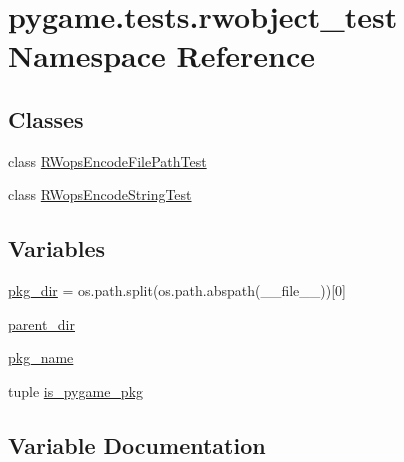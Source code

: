 \hypertarget{namespacepygame_1_1tests_1_1rwobject__test}{}\section{pygame.\+tests.\+rwobject\+\_\+test Namespace Reference}
\label{namespacepygame_1_1tests_1_1rwobject__test}
\subsection*{Classes}
\begin{DoxyCompactItemize}
\item 
class \hyperlink{classpygame_1_1tests_1_1rwobject__test_1_1_r_wops_encode_file_path_test}{R\+Wops\+Encode\+File\+Path\+Test}
\item 
class \hyperlink{classpygame_1_1tests_1_1rwobject__test_1_1_r_wops_encode_string_test}{R\+Wops\+Encode\+String\+Test}
\end{DoxyCompactItemize}
\subsection*{Variables}
\begin{DoxyCompactItemize}
\item 
\hyperlink{namespacepygame_1_1tests_1_1rwobject__test_a3fb45004da4d4f211f109ee5214ae801}{pkg\+\_\+dir} = os.\+path.\+split(os.\+path.\+abspath(\+\_\+\+\_\+file\+\_\+\+\_\+))\mbox{[}0\mbox{]}
\item 
\hyperlink{namespacepygame_1_1tests_1_1rwobject__test_ad3e0ae8f61efa7c762b5a540f91f0a77}{parent\+\_\+dir}
\item 
\hyperlink{namespacepygame_1_1tests_1_1rwobject__test_ac3906f84fd68b336f0a0139c068d6f6a}{pkg\+\_\+name}
\item 
tuple \hyperlink{namespacepygame_1_1tests_1_1rwobject__test_ad9e88542a72ede73a503f6e64dc69843}{is\+\_\+pygame\+\_\+pkg}
\end{DoxyCompactItemize}


\subsection{Variable Documentation}
\mbox{\label{namespacepygame_1_1tests_1_1rwobject__test_ad9e88542a72ede73a503f6e64dc69843}} 
